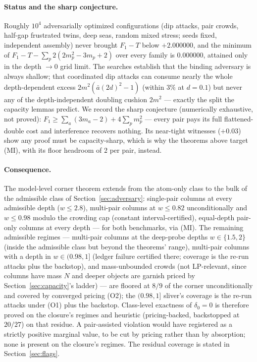 \documentclass[11pt]{article}
\theoremstyle{plain}
\theoremstyle{definition}
\theoremstyle{remark}
\begin{document}
\paragraph{Status and the sharp conjecture.}
Roughly $10^4$ adversarially optimized configurations (dip attacks, pair crowds,
half-gap frustrated twins, deep seas, random mixed stress; seeds fixed,
independent assembly) never brought $F_1 - T$ below $+2.000000$, and the minimum
of $F_1 - T - \sum_p 2(2 m_p^2 - 3 m_p + 2)$ over every family is $0.000000$,
attained only in the depth $\to 0$ grid limit. The searches establish that the
binding adversary is always shallow; that coordinated dip attacks can consume
nearly the whole depth-dependent excess $2m^2(\bar{a}(2d)^2 - 1)$ (within $3\%$
at $d = 0.1$) but never any of the depth-independent doubling cushion $2m^2$ ---
exactly the split the capacity lemmas predict. We record the sharp conjecture
(numerically exhaustive, not proved):
$F_1 \ge \sum_a (3 m_a - 2) + 4\sum_p m_p^2$ --- every pair pays its full
flattened-double cost and interference recovers nothing. Its near-tight witnesses
($+0.03$) show any proof must be capacity-sharp, which is why the theorems above
target (MI), with its floor headroom of $2$ per pair, instead.

\paragraph{Consequence.}
The model-level corner theorem extends from the atom-only class to the bulk of
the admissible class of Section~\ref{sec:adversary}: single-pair columns at
every admissible depth ($w \le 2.8$), multi-pair columns at $w \le 0.82$
unconditionally and
$w \le 0.98$ modulo the crowding cap (constant interval-certified), equal-depth
pair-only columns at every depth --- for both benchmarks, via (MI). The remaining
admissible regimes --- multi-pair columns at the deep-probe depths
$w \in \{1.5, 2\}$ (inside the admissible class but beyond the theorems' range),
multi-pair columns with a depth in $w \in (0.98, 1]$ (ledger failure certified
there; coverage is the re-run attacks plus the backstop), and mass-unbounded
crowds (not LP-relevant, since columns have mass $N$ and deeper objects are
garnish priced by Section~\ref{sec:capacity}'s ladder) --- are floored at $8/9$
of the corner unconditionally and covered by converged pricing (O2); the
$(0.98, 1]$ sliver's coverage is the re-run attacks under (O1) plus the backstop.
Class-level exactness of $\delta_0 = 0$ is therefore proved on the closure's
regimes and heuristic (pricing-backed, backstopped at $20/27$) on that residue.
A pair-assisted violation would have registered as a strictly positive marginal
value, to be cut by pricing rather than by absorption; none is present on the
closure's regimes. The residual coverage is stated in Section~\ref{sec:flags}.
\end{document}
